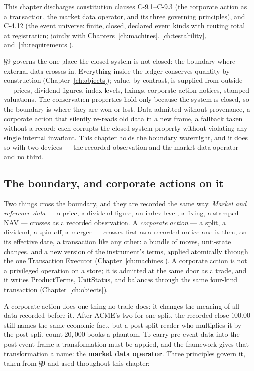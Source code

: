 \documentclass[11pt,a4paper]{article}
\begin{document}
This chapter discharges constitution clauses C-9.1--C-9.3 (the corporate action as a transaction, the market data operator, and its three governing principles), and C-4.12 (the event universe: finite, closed, declared event kinds with routing total at registration; jointly with Chapters~\ref{ch:machines}, \ref{ch:testability}, and~\ref{ch:requirements}).

\S 9 governs the one place the closed system is not closed: the boundary where external
data crosses in. Everything inside the ledger conserves quantity by construction
(Chapter~\ref{ch:objects}); value, by contrast, is supplied from outside --- prices,
dividend figures, index levels, fixings, corporate-action notices, stamped valuations.
The conservation properties hold only because the system is closed, so the boundary is
where they are won or lost. Data admitted without provenance, a corporate action that
silently re-reads old data in a new frame, a fallback taken without a record: each
corrupts the closed-system property without violating any single internal invariant. This
chapter holds the boundary watertight, and it does so with two devices --- the recorded
observation and the market data operator --- and no third.

\subsection{The boundary, and corporate actions on it}

Two things cross the boundary, and they are recorded the same way. \emph{Market and
reference data} --- a price, a dividend figure, an index level, a fixing, a stamped NAV
--- crosses as a recorded observation. A \emph{corporate action} --- a split, a dividend,
a spin-off, a merger --- crosses first as a recorded notice and is then, on its effective
date, a transaction like any other: a bundle of moves, unit-state changes, and a new
version of the instrument's terms, applied atomically through the one Transaction Executor
(Chapter~\ref{ch:machines}). A corporate action is not a privileged operation on a store;
it is admitted at the same door as a trade, and it writes ProductTerms, UnitStatus, and
balances through the same four-kind transaction (Chapter~\ref{ch:objects}).

A corporate action does one thing no trade does: it changes the meaning of all data
recorded before it. After ACME's two-for-one split, the recorded close $100.00$ still
names the same economic fact, but a post-split reader who multiplies it by the post-split
count $20{,}000$ books a phantom. To carry pre-event data into the post-event frame a
transformation must be applied, and the framework gives that transformation a name: the
\textbf{market data operator}. Three principles govern it, taken from \S 9 and used
throughout this chapter:
\end{document}
